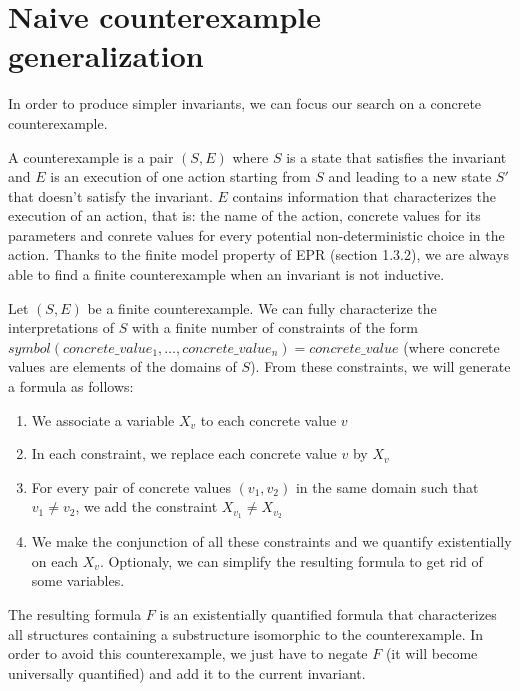 \documentclass[11pt,a4paper,oldfontcommands]{memoir}
\begin{document}
    \section{Naive counterexample generalization}

    In order to produce simpler invariants, we can focus our search on a concrete counterexample.

    A counterexample is a pair \( (S,E) \) where \(S\) is a state that satisfies the invariant and \(E\) is an execution of one action starting from \(S\)
    and leading to a new state \(S'\) that doesn't satisfy the invariant. \(E\) contains information that characterizes the execution of an action, that is:
    the name of the action, concrete values for its parameters and conrete values for every potential non-deterministic choice in the action.
    Thanks to the finite model property of EPR (section 1.3.2), we are always able to find a finite counterexample when an invariant is not inductive.
    
    Let \( (S,E) \) be a finite counterexample.
    We can fully characterize the interpretations of \(S\) with a finite number of constraints of the form \(symbol(concrete\_value_1,\ldots,concrete\_value_n) = concrete\_value\)
    (where concrete values are elements of the domains of \(S\)).
    From these constraints, we will generate a formula as follows:
    \begin{enumerate}
        \item We associate a variable \( X_v \) to each concrete value \(v\)
        \item In each constraint, we replace each concrete value \(v\) by \( X_v \)
        \item For every pair of concrete values \( (v_1,v_2) \) in the same domain such that \( v_1 \neq v_2 \), we add the constraint \( X_{v_1} \neq X_{v_2} \)
        \item We make the conjunction of all these constraints and we quantify existentially on each \(X_v\). Optionaly, we can simplify the resulting formula to get rid of some variables.
    \end{enumerate}
    
    The resulting formula \(F\) is an existentially quantified formula that characterizes all structures containing a substructure isomorphic to the counterexample.
    In order to avoid this counterexample, we just have to negate \(F\) (it will become universally quantified) and add it to the current invariant.
\end{document}
